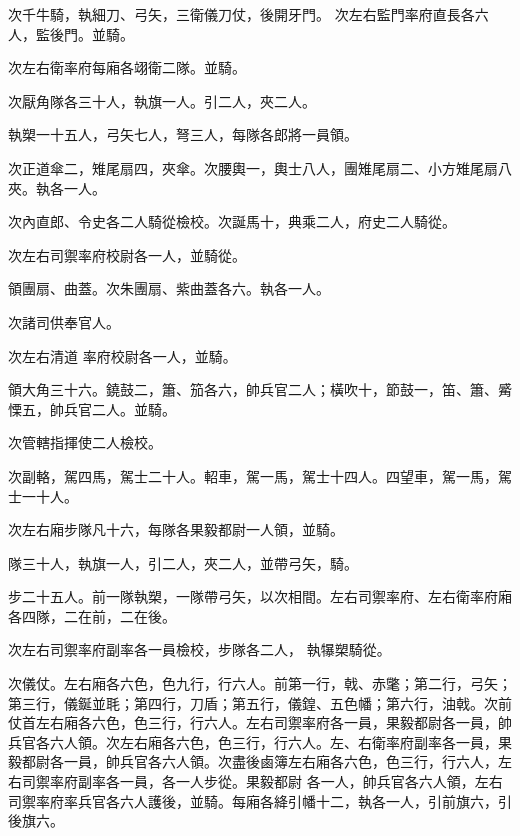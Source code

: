 \begin{pinyinscope}
 次千牛騎，執細刀、弓矢，三衛儀刀仗，後開牙門。
 次左右監門率府直長各六人，監後門。並騎。



 次左右衛率府每廂各翊衛二隊。並騎。



 次厭角隊各三十人，執旗一人。引二人，夾二人。



 執槊一十五人，弓矢七人，弩三人，每隊各郎將一員領。



 次正道傘二，雉尾扇四，夾傘。次腰輿一，輿士八人，團雉尾扇二、小方雉尾扇八夾。執各一人。



 次內直郎、令史各二人騎從檢校。次誕馬十，典乘二人，府史二人騎從。



 次左右司禦率府校尉各一人，並騎從。



 領團扇、曲蓋。次朱團扇、紫曲蓋各六。執各一人。



 次諸司供奉官人。



 次左右清道
 率府校尉各一人，並騎。



 領大角三十六。鐃鼓二，簫、笳各六，帥兵官二人；橫吹十，節鼓一，笛、簫、觱慄五，帥兵官二人。並騎。



 次管轄指揮使二人檢校。



 次副輅，駕四馬，駕士二十人。軺車，駕一馬，駕士十四人。四望車，駕一馬，駕士一十人。



 次左右廂步隊凡十六，每隊各果毅都尉一人領，並騎。



 隊三十人，執旗一人，引二人，夾二人，並帶弓矢，騎。



 步二十五人。前一隊執槊，一隊帶弓矢，以次相間。左右司禦率府、左右衛率府廂各四隊，二在前，二在後。



 次左右司禦率府副率各一員檢校，步隊各二人，
 執犦槊騎從。



 次儀仗。左右廂各六色，色九行，行六人。前第一行，戟、赤氅；第二行，弓矢；第三行，儀鋋並毦；第四行，刀盾；第五行，儀鍠、五色幡；第六行，油戟。次前仗首左右廂各六色，色三行，行六人。左右司禦率府各一員，果毅都尉各一員，帥兵官各六人領。次左右廂各六色，色三行，行六人。左、右衛率府副率各一員，果毅都尉各一員，帥兵官各六人領。次盡後鹵簿左右廂各六色，色三行，行六人，左右司禦率府副率各一員，各一人步從。果毅都尉
 各一人，帥兵官各六人領，左右司禦率府率兵官各六人護後，並騎。每廂各絳引幡十二，執各一人，引前旗六，引後旗六。




\end{pinyinscope}
